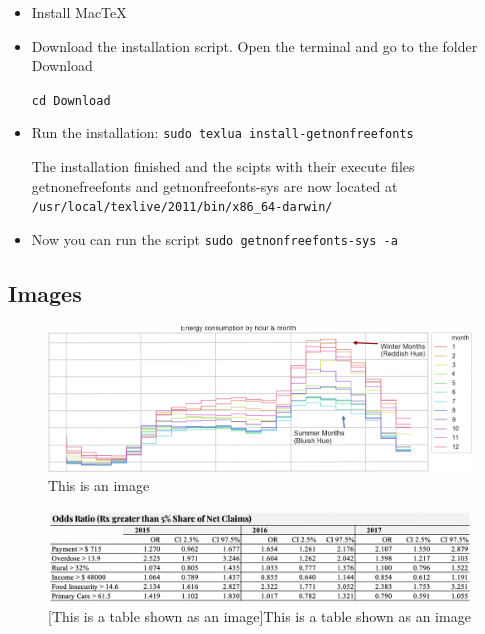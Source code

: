 \begin{itemize}
	\item Install MacTeX 
	\item Download the installation script. Open the terminal and go to the folder Download
	
	\texttt{cd Download}
	\item Run the installation: \texttt{sudo texlua install-getnonfreefonts}
	
	The installation finished and the scipts with their execute files getnonefreefonts and getnonfreefonts-sys are now located at \texttt{/usr/local/texlive/2011/bin/x86\_64-darwin/}
	
	\item Now you can run the script \texttt{sudo getnonfreefonts-sys -a}
\end{itemize}

\subsection{Images}
\begin{figure}[!ht]
	\centering
	\includegraphics[width=16cm]{images/testimage1}
	\caption{This is an image}
	\label{fig:testimage1}
\end{figure}

\begin{figure}[!ht]
	\centering
	\includegraphics[width=16cm]{images/testimage2}
	[This is a table shown as an image]{This is a table shown as an image}
	\label{fig:testimage2}
\end{figure}


